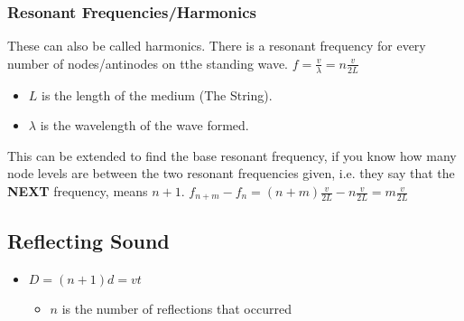 \documentclass[10pt,letterpaper,final,twoside,notitlepage]{article}
\numberwithin{equation}{section} %
\begin{document}
		\subsubsection*{Resonant Frequencies/Harmonics} \label{subsubsec:Resonant Frequencies/Harmonics}
		These can also be called harmonics. There is a resonant frequency for every number of nodes/antinodes on tthe standing wave. \newline
		$f = \frac{v}{\lambda} = n \frac{v}{2L}$
		\begin{itemize}[noitemsep]
			\item $L$ is the length of the medium (The String).
			\item $\lambda$ is the wavelength of the wave formed.
		\end{itemize}
		This can be extended to find the base resonant frequency, if you know how many node levels are between the two resonant frequencies given, i.e. they say that the \textbf{NEXT} frequency, means $n+1$. \newline
		$f_{n+m}-f_{n} = \left( n+m \right) \frac{v}{2L} - n \frac{v}{2L} = m \frac{v}{2L}$
		
	\subsection*{Reflecting Sound} \label{subsec:Reflecting Sound}
		\begin{itemize}[noitemsep]
			\item $D = \left( n + 1 \right)d = vt$
			\begin{itemize}[noitemsep,nolistsep]
				\item $n$ is the number of reflections that occurred
			\end{itemize}
		\end{itemize}
\end{document}
